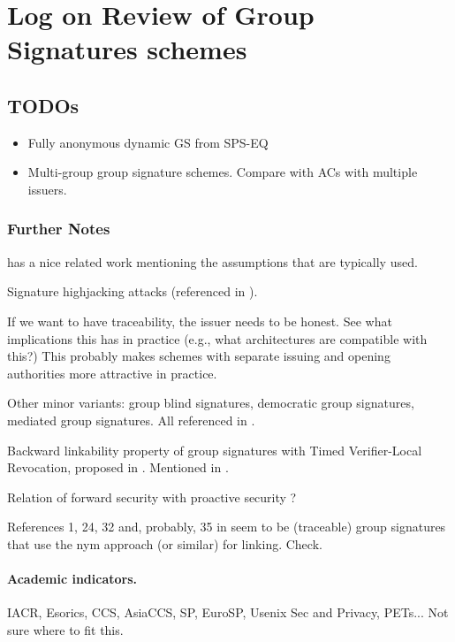 \section{Log on Review of Group Signatures schemes}
\label{app:ac}

\subsection{TODOs}

\begin{itemize}
\item Fully anonymous dynamic GS from SPS-EQ \cite{ds16}
\item Multi-group group signature schemes. Compare with ACs with multiple
  issuers.
\end{itemize}

\subsubsection{Further Notes}


\cite{ehk+19} has a nice related work mentioning the assumptions that are
typically used.

Signature highjacking attacks (referenced in \cite{ehk+19}).

If we want to have traceability, the issuer needs to be honest. See what
implications this has in practice (e.g., what architectures are compatible
with this?) This probably makes schemes with separate issuing and opening
authorities more attractive in practice.

Other minor variants: group blind signatures, democratic group signatures,
mediated group signatures. All referenced in \cite[Section 1.3.5]{bsi12}.

Backward linkability property of group signatures with Timed Verifier-Local
Revocation, proposed in \cite{nf05}. Mentioned in \cite[Section 8.1.2]{bsi12}.

Relation of forward security with proactive security \cite{oy91}?

References 1, 24, 32 and, probably, 35 in \cite{bfg+11} seem to be (traceable)
group signatures that use the nym approach (or similar) for linking. Check.

\paragraph{Academic indicators.}
IACR, Esorics, CCS, AsiaCCS, SP, EuroSP, Usenix Sec and Privacy, PETs... Not
sure where to fit this.

